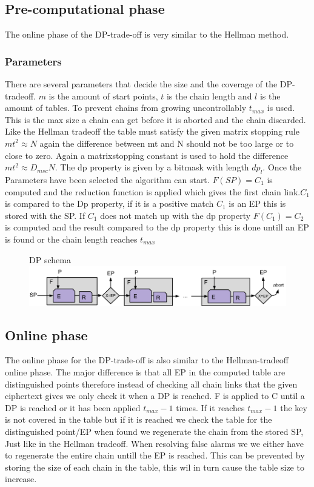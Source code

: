 \subsection{Pre-computational phase}
The online phase of the DP-trade-off is very similar to the Hellman method.
\subsubsection{Parameters}
There are several parameters that decide the size and the coverage of
the DP-tradeoff. $m$ is the amount of start points, $t$ is the chain length  and $l$ is the amount of tables.
To prevent chains from growing uncontrollably $t_{max}$ is used. This is the max size a chain can get before it is aborted and the chain discarded.
Like the Hellman tradeoff the table must satisfy the
given matrix stopping rule $mt^2\approx N$ again the difference between
mt and N should not be too large or to close to zero. Again a
matrixstopping constant is used to hold the difference $mt^2\approx
D_{msc}N$. The dp property is given by a bitmask with length $dp_l$.
Once the Parameters have been selected the algorithm can start. $F(SP)=C_1$ is computed and the reduction function is applied which gives the first chain link.$C_1$ is compared to the Dp property, if it is a positive match $C_1$ is an EP this is stored with the SP. If $C_1$ does not match up with the dp property $F(C_1)=C_2$ is computed and the result compared to the dp property this is done untill an EP is found or the chain length reaches $t_{max}$
\begin{figure}[th]
  DP schema
  \includegraphics[width=\textwidth]{figures/DPSchema.png}
  \centering
\end{figure}
\subsection{Online phase}
The online phase for the DP-trade-off is also similar to the Hellman-tradeoff online phase. The major difference is that all EP in the computed table are distinguished points therefore instead of checking all chain links that the given ciphertext gives we only check it when a DP is reached. F is applied to C until a DP is reached or it has been applied $t_{max}-1$ times. If it reaches $t_{max}-1$ the key is not covered in the table but if it is reached we check the table for the distinguished point/EP when found we regenerate the chain from the stored SP, Just like in the Hellman tradeoff. When resolving false alarms we we either have to regenerate the entire chain untill the EP is reached. This can be prevented by storing the size of each chain in the table, this wil in turn cause the table size to increase.

